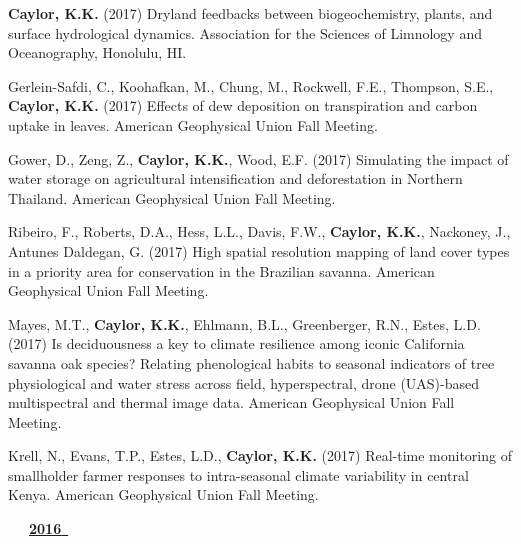 \begin{etaremune}
\item \textbf{ Caylor, K.K.} (2017) Dryland feedbacks between biogeochemistry, plants, and surface hydrological dynamics. Association for the Sciences of Limnology and Oceanography, Honolulu, HI.
\item Gerlein-Safdi, C., Koohafkan, M., Chung, M., Rockwell, F.E., Thompson, S.E., \textbf{ Caylor, K.K.} (2017) Effects of dew deposition on transpiration and carbon uptake in leaves. American Geophysical Union Fall Meeting.
\item Gower, D., Zeng, Z., \textbf{ Caylor, K.K.}, Wood, E.F. (2017) Simulating the impact of water storage on agricultural intensification and deforestation in Northern Thailand. American Geophysical Union Fall Meeting.
\item Ribeiro, F., Roberts, D.A., Hess, L.L., Davis, F.W., \textbf{ Caylor, K.K.}, Nackoney, J., Antunes Daldegan, G. (2017) High spatial resolution mapping of land cover types in a priority area for conservation in the Brazilian savanna. American Geophysical Union Fall Meeting.
\item Mayes, M.T., \textbf{ Caylor, K.K.}, Ehlmann, B.L., Greenberger, R.N., Estes, L.D. (2017) Is deciduousness a key to climate resilience among iconic California savanna oak species? Relating phenological habits to seasonal indicators of tree physiological and water stress across field, hyperspectral, drone (UAS)-based multispectral and thermal image data. American Geophysical Union Fall Meeting.
\item Krell, N., Evans, T.P., Estes, L.D., \textbf{ Caylor, K.K.} (2017) Real-time monitoring of smallholder farmer responses to intra-seasonal climate variability in central Kenya. American Geophysical Union Fall Meeting.

\vspace{0.1in}
\mbox{\ \ \ \underline{\textbf{2016 }}}
\vspace{0.1in}


\end{etaremune}
